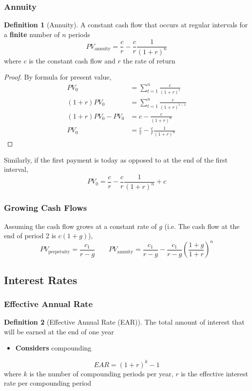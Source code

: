 \documentclass[11pt]{article}
\theoremstyle{definition}
\newtheorem*{definition}{Definition}
\begin{document}
\subsubsection{Annuity}
\begin{definition}[Annuity]
    A constant cash flow that occurs at regular intervals for a \textbf{finite} number of $n$ periods
    \begin{equation*}
        PV_{\text{annuity}} = \frac{c}{r} - \frac{c}{r}\frac{1}{(1 + r)^n}
    \end{equation*}
    where $c$ is the constant cash flow and $r$ the rate of return
\end{definition}
\begin{proof}
    By formula for present value,
    \begin{align*}
        PV_0 &= \sum_{t=1}^n \frac{c}{(1 + r)^t}\\
        (1  +r)PV_0 &= \sum_{t=1}^n \frac{c}{(1 + r)^{t-1}}\\
        (1 + r)PV_0 - PV_0 &= c - \frac{c}{(1 + r)^n}\\
        PV_0 &= \frac{c}{r} - \frac{c}{r}\frac{1}{(1 + r)^n}
    \end{align*}
\end{proof}
Similarly, if the first payment is today as opposed to at the end of the first interval, 
\begin{equation*}
    PV_0 = \frac{c}{r} - \frac{c}{r}\frac{1}{(1 + r)^n} + c
\end{equation*}
\subsubsection{Growing Cash Flows}
Assuming the cash flow grows at a constant rate of $g$ (i.e. The cash flow at the end of period 2 is $c(1 + g)$), 
\begin{equation*}
    PV_{\text{perpetuity}} = \frac{c_1}{r - g} \qquad PV_{\text{annuity}} = \frac{c_1}{r-g} - \frac{c_1}{r-g}\left(\frac{1+g}{1 + r}\right)^n
\end{equation*}

\subsection{Interest Rates}
\subsubsection{Effective Annual Rate}
\begin{definition}[Effective Annual Rate (EAR)]
    The total amount of interest that will be earned at the end of one year
    \begin{itemize}
        \item \textbf{Considers} compounding
    \end{itemize}
    \begin{equation*}
        EAR = (1 + r)^k - 1
    \end{equation*}
    where $k$ is the number of compounding periods per year, $r$ is the effective interest rate per compounding period
\end{definition}
\end{document}
